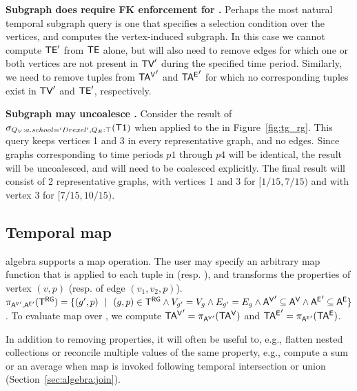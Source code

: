 {\bf Subgraph does require FK enforcement for \tve.}  Perhaps the most
natural temporal subgraph query is one that specifies a selection
condition over the vertices, and computes the vertex-induced subgraph.
In this case we cannot compute $\textsf{TE}'$ from $\textsf{TE}$ alone, but will also
need to remove edges for which one or both vertices are not present in
$\textsf{TV}'$ during the specified time period.  Similarly, we need to remove
tuples from $\mathsf{TA^{V}}'$ and $\mathsf{TA^{E}}'$ for which no corresponding tuples
exist in $\textsf{TV}'$ and $\textsf{TE}'$, respectively.

{\bf Subgraph may uncoalesce \trg.} Consider the result of
$\sigma_{Q_V:{a.school='Drexel'},Q_E:\top} (\textsf{T1})$ when applied
to the \tg in Figure~\ref{fig:tg_rg}.  This query keeps vertices 1 and
3 in every representative graph, and no edges.  Since graphs
corresponding to time periods $p1$ through $p4$ will be identical, the
result will be uncoalesced, and will need to be coalesced explicitly.
The final result will consist of 2 representative graphs, with
vertices 1 and 3 for $[1/15, 7/15)$ and with vertex 3 for $[7/15,
    10/15)$.

\subsection{Temporal map}%
\label{sec:algebra:project}


\tg algebra supports a map operation.  The user may specify an
arbitrary map function that is applied to each tuple in \avv
(resp. \aee), and transforms the properties of vertex $(v,p)$
(resp. of edge $(v_1,v_2,p)$).  $\pi_{\mathsf{A^{V}}',\mathsf{A^{E}}'} (\mathsf{T^{RG}}) = \{ (g',
p)~~|~~(g, p) \in \mathsf{T^{RG}} \wedge V_{g'} = V_{g} \wedge E_{g'} = E_{g}
\wedge \mathsf{A^{V}}' \subseteq \mathsf{A^{V}} \wedge \mathsf{A^{E}}' \subseteq \mathsf{A^{E}} \}$.  To
evaluate map over \tve, we compute $\mathsf{TA^{V}}' = \pi_{\mathsf{A^{V}}'} (\mathsf{TA^{V}})$ and
$\mathsf{TA^{E}}' = \pi_{\mathsf{A^{E}}'} (\mathsf{TA^{E}})$.


In addition to removing properties, it will often be useful to, e.g.,
flatten nested collections or reconcile multiple values of the same
property, e.g., compute a sum or an average when map is invoked
following temporal intersection or union
(Section~\ref{sec:algebra:join}).

